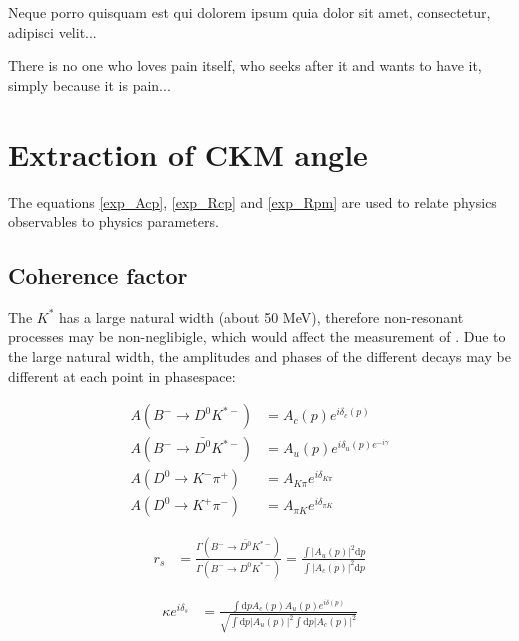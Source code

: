 \clearpage
\begin{savequote}[8cm]
\textlatin{Neque porro quisquam est qui dolorem ipsum quia dolor sit amet, consectetur, adipisci velit...}

There is no one who loves pain itself, who seeks after it and wants to have it, simply because it is pain...
\end{savequote}

\chapter{\label{ch:6-interpretation}Extraction of CKM angle \Pgamma} 

\minitoc

The equations \ref{exp_Acp}, \ref{exp_Rcp} and \ref{exp_Rpm} are used to relate physics observables to physics parameters. 

\section{Coherence factor}
\label{sec:interpretation:coherence}

The $K^*$ has a large natural width (about 50 MeV), therefore non-resonant processes may be non-neglibigle, which would affect the measurement of \Pgamma. Due to the large natural width, the amplitudes and phases of the different decays may be different at each point in phasespace:

\begin{align*}
A(B^- \to D^0 K^{*-}) &= A_c(p) e^{i\delta_c(p)} \\
A(B^- \to \bar{D^0} K^{*-}) &= A_u(p) e^{i\delta_u(p) e^{-i\gamma}} \\
A(D^0 \to K^-\pi^+) &= A_{K\pi} e^{i\delta_{K\pi}} \\
A(D^0 \to K^+\pi^-) &= A_{{\pi}K} e^{i\delta_{{\pi}K}} 
\end{align*}

\begin{align*}
r_s &= \frac{\Gamma(B^- \to \bar{D^0}K^{*-})}{\Gamma(B^- \to D^0K^{*-})} = \frac{\int \left|A_u(p)\right|^2 \mathrm{d}p}{\int \left|A_c(p)\right|^2 \mathrm{d}p}
\end{align*}

\begin{align}
\kappa e^{i\delta_s} &= \frac{\int \mathrm{d}p A_c(p)A_u(p)e^{i\delta(p)}}{\sqrt{\int \mathrm{d}p \left|A_u(p)\right|^2 \int \mathrm{d}p \left|A_c(p)\right|^2}}
\label{kappadefinition}
\end{align}

